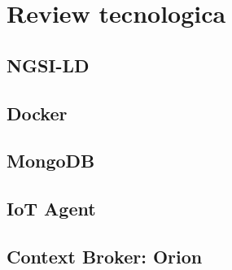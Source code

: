 \chapter{Review tecnologica}

\section{NGSI-LD}


\section{Docker}


\section{MongoDB}


\section{IoT Agent}


\section{Context Broker: Orion}
